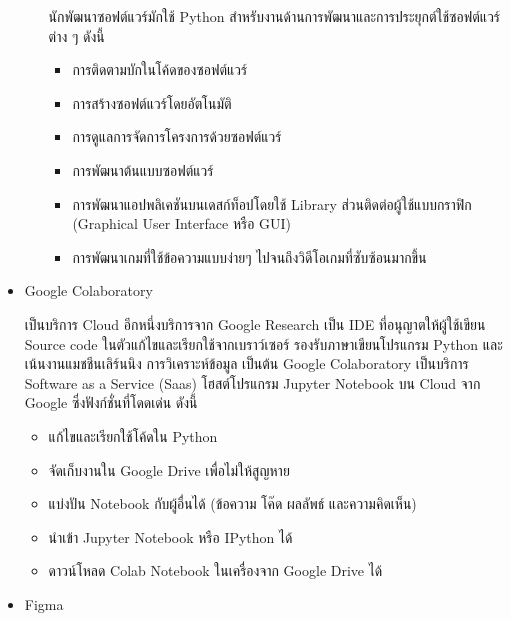 \documentclass[12pt,oneside,openright,a4paper]{cpe-thai-project}
\begin{document}
\begin{itemize}
\begin{itemize}
        \hspace{1cm}นักพัฒนาซอฟต์แวร์มักใช้ Python สำหรับงานด้านการพัฒนาและการประยุกต์ใช้ซอฟต์แวร์ต่าง ๆ ดังนี้
          \begin{itemize}
            \item การติดตามบักในโค้ดของซอฟต์แวร์
            \item การสร้างซอฟต์แวร์โดยอัตโนมัติ
            \item การดูแลการจัดการโครงการด้วยซอฟต์แวร์
            \item การพัฒนาต้นแบบซอฟต์แวร์
            \item การพัฒนาแอปพลิเคชันบนเดสก์ท็อปโดยใช้ Library ส่วนติดต่อผู้ใช้แบบกราฟิก (Graphical User Interface หรือ GUI)
            \item การพัฒนาเกมที่ใช้ข้อความแบบง่ายๆ ไปจนถึงวิดีโอเกมที่ซับซ้อนมากขึ้น
          \end{itemize}
      \end{itemize}
      \item Google Colaboratory
      
      \hspace{1cm}เป็นบริการ Cloud อีกหนึ่งบริการจาก Google Research เป็น IDE ที่อนุญาตให้ผู้ใช้เขียน Source code ในตัวแก้ไขและเรียกใช้จากเบราว์เซอร์ 
      รองรับภาษาเขียนโปรแกรม Python และเน้นงานแมชชีนเลิร์นนิง การวิเคราะห์ข้อมูล เป็นต้น 
      Google Colaboratory เป็นบริการ Software as a Service (Saas) โฮสต์โปรแกรม Jupyter Notebook บน Cloud จาก Google ซึ่งฟังก์ชั่นที่โดดเด่น ดังนี้ \cite{colab}
        \begin{itemize}
          \item แก้ไขและเรียกใช้โค้ดใน Python
          \item จัดเก็บงานใน Google Drive เพื่อไม่ให้สูญหาย
          \item แบ่งปัน Notebook กับผู้อื่นได้ (ข้อความ โค๊ด ผลลัพธ์ และความคิดเห็น)
          \item นำเข้า Jupyter Notebook หรือ IPython ได้
          \item ดาวน์โหลด Colab Notebook ในเครื่องจาก Google Drive ได้
        \end{itemize}
      \item Figma
      

\end{itemize}
\end{document}
